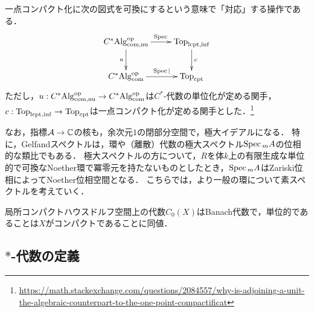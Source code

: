 \documentclass[uplatex,dvipdfmx]{jsreport}
\begin{document}
\begin{remarks}[一点コンパクト化との対応]
    一点コンパクト化に次の図式を可換にするという意味で「対応」する操作である．
    \[\xymatrix{
        C^*\Alg_{\com,\nonunital}^\op\ar[r]^-{\Spec}\ar[d]_-{u}&\Top_{\lcpt,\infinity}\ar[d]^-c\\
        C^*\Alg^\op_\com\ar[r]^-{\Spec|}&\Top_\cpt
    }\]
    ただし，$u:C^*\mathrm{Alg}^{\mathrm{op}}_{\mathrm{com},\mathrm{nu}}\to C^*\mathrm{Alg}^{\mathrm{op}}_{\mathrm{com}}$は$C^*$-代数の単位化が定める関手，$c:\mathrm{Top}_{\mathrm{lcpt},\mathrm{inf}}\to\mathrm{Top}_{\mathrm{cpt}}$は一点コンパクト化が定める関手とした．\footnote{\url{https://math.stackexchange.com/questions/2084557/why-is-adjoining-a-unit-the-algebraic-counterpart-to-the-one-point-compactificat}}
\end{remarks}

\begin{remark}[極大スペクトルとの関係]
    なお，指標$\mathcal{A}\to\mathbb{C}$の核も，余次元$1$の閉部分空間で，極大イデアルになる．
    特に，Gelfandスペクトルは，環や（離散）代数の極大スペクトル$\mathrm{Spec}\,_mA$の位相的な類比でもある．
    極大スペクトルの方について，$R$を体$k$上の有限生成な単位的で可換なNoether環で冪零元を持たないものとしたとき，$\mathrm{Spec}\,_mA$はZariski位相によってNoether位相空間となる．
    こちらでは，より一般の環について素スペクトルを考えていく．
\end{remark}

\begin{example}
    局所コンパクトハウスドルフ空間上の代数$C_0(X)$はBanach代数で，単位的であることは$X$がコンパクトであることに同値．
\end{example}

\subsection{$*$-代数の定義}
\end{document}
